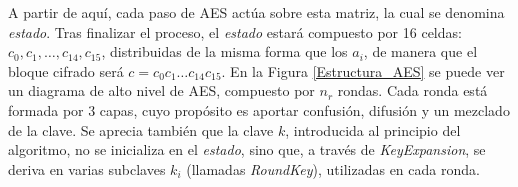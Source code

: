 A partir de aquí, cada paso de AES actúa sobre esta matriz, la cual se denomina \textit{estado}. Tras finalizar el proceso, el \textit{estado} estará compuesto por 16 celdas: $c_0, c_1, \ldots, c_{14},c_{15}$, distribuidas de la misma forma que los $a_i$, de manera que el bloque cifrado será $c = c_0c_1\ldots c_{14}c_{15}$. En la Figura \ref{Estructura_AES} se puede ver un diagrama de alto nivel de AES, compuesto por $n_r$ rondas. Cada ronda está formada por 3 capas, cuyo propósito es aportar confusión, difusión y un mezclado de la clave. Se aprecia también que la clave $k$, introducida al principio del algoritmo, no se inicializa en el \textit{estado}, sino que, a través de \textit{KeyExpansion}, se deriva en varias subclaves $k_i$ (llamadas \textit{RoundKey}), utilizadas en cada ronda.



